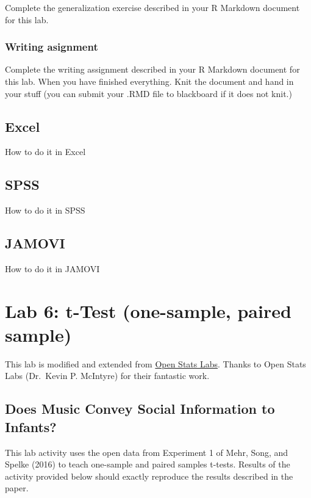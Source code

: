 \documentclass[]{book}
\theoremstyle{definition}
\theoremstyle{definition}
\theoremstyle{definition}
\theoremstyle{remark}
\begin{document}
Complete the generalization exercise described in your R Markdown
document for this lab.

\subsection{Writing asignment}\label{writing-asignment-3}

Complete the writing assignment described in your R Markdown document
for this lab. When you have finished everything. Knit the document and
hand in your stuff (you can submit your .RMD file to blackboard if it
does not knit.)

\section{Excel}\label{excel-4}

How to do it in Excel

\section{SPSS}\label{spss-4}

How to do it in SPSS

\section{JAMOVI}\label{jamovi-4}

How to do it in JAMOVI

\chapter{Lab 6: t-Test (one-sample, paired
sample)}\label{lab-6-t-test-one-sample-paired-sample}

This lab is modified and extended from
\href{https://sites.trinity.edu/osl}{Open Stats Labs}. Thanks to Open
Stats Labs (Dr.~Kevin P. McIntyre) for their fantastic work.

\section{Does Music Convey Social Information to
Infants?}\label{does-music-convey-social-information-to-infants}

This lab activity uses the open data from Experiment 1 of Mehr, Song,
and Spelke (2016) to teach one-sample and paired samples t-tests.
Results of the activity provided below should exactly reproduce the
results described in the paper.
\end{document}
